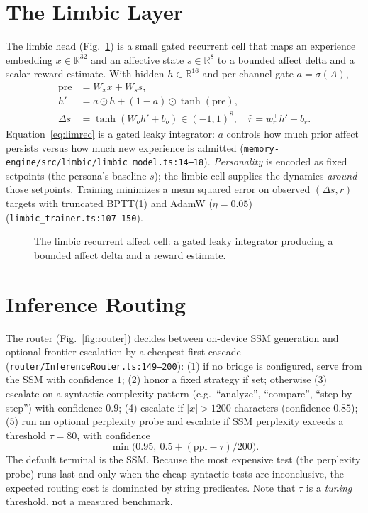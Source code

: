 \documentclass[journal,onecolumn,11pt]{IEEEtran}
\newcommand{\R}{\mathbb{R}}
\begin{document}
\section{The Limbic Layer}
\label{sec:limbic}
The limbic head (Fig.~\ref{fig:limbic}) is a small gated recurrent cell that maps
an experience embedding $x\in\R^{32}$ and an affective state $s\in\R^{8}$ to a
bounded affect delta and a scalar reward estimate. With hidden $h\in\R^{16}$ and
per-channel gate $a=\sigma(A)$,
\begin{align}
\text{pre}&=W_x x + W_s s,\\
h' &= a\odot h + (1-a)\odot\tanh(\text{pre}),\label{eq:limrec}\\
\Delta s &= \tanh(W_o h' + b_o)\in(-1,1)^8,\quad
\hat r = w_r^\top h' + b_r.
\end{align}
Equation~\eqref{eq:limrec} is a gated leaky integrator: $a$ controls how much
prior affect persists versus how much new experience is admitted
(\texttt{memory-engine/src/limbic/limbic\_model.ts:14--18}). \emph{Personality}
is encoded as fixed setpoints (the persona's baseline $s$); the limbic cell
supplies the dynamics \emph{around} those setpoints. Training minimizes a mean
squared error on observed $(\Delta s,r)$ targets with truncated BPTT(1) and AdamW
($\eta{=}0.05$) (\texttt{limbic\_trainer.ts:107--150}).

\begin{figure}[t]
\centering

\caption{The limbic recurrent affect cell: a gated leaky integrator producing a
bounded affect delta and a reward estimate.}
\label{fig:limbic}
\end{figure}

\section{Inference Routing}
\label{sec:router}
The router (Fig.~\ref{fig:router}) decides between on-device SSM generation and
optional frontier escalation by a cheapest-first cascade
(\texttt{router/InferenceRouter.ts:149--200}): (1) if no bridge is configured,
serve from the SSM with confidence $1$; (2) honor a fixed strategy if set;
otherwise (3) escalate on a syntactic complexity pattern (e.g.\ ``analyze'',
``compare'', ``step by step'') with confidence $0.9$; (4) escalate if
$|x|>1200$ characters (confidence $0.85$); (5) run an optional perplexity probe
and escalate if SSM perplexity exceeds a threshold $\tau{=}80$, with confidence
\begin{equation}
\min\!\big(0.95,\ 0.5+(\mathrm{ppl}-\tau)/200\big).
\label{eq:routerconf}
\end{equation}
The default terminal is the SSM. Because the most expensive test (the perplexity
probe) runs last and only when the cheap syntactic tests are inconclusive, the
expected routing cost is dominated by string predicates. Note that $\tau$ is a
\emph{tuning} threshold, not a measured benchmark.
\end{document}

